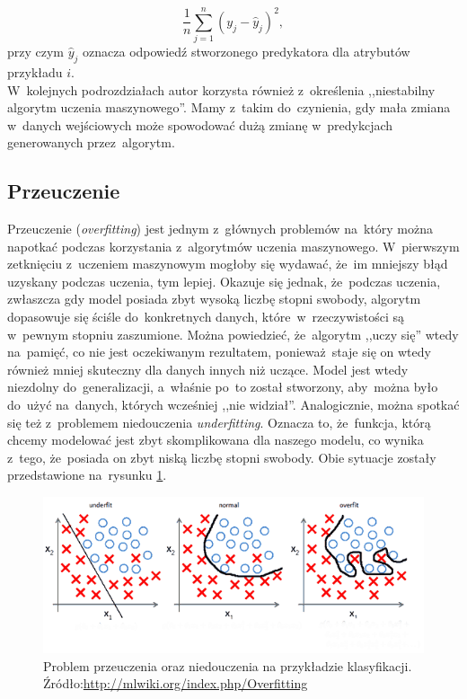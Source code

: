 \begin{equation}
\frac{1}{n} \sum_{j=1}^{n}(y_j - \hat{y}_j)^{2}, 
\end{equation}
przy czym $\hat{y}_j$ oznacza odpowiedź stworzonego predykatora dla atrybutów przykładu $i$.\\
W~kolejnych podrozdziałach autor korzysta również z~określenia ,,niestabilny algorytm uczenia maszynowego''. Mamy z~takim do~czynienia, gdy mała zmiana w~danych wejściowych może spowodować dużą zmianę w~predykcjach generowanych przez~algorytm\cite{ensemble}.

\subsection{Przeuczenie}\label{overfitting_section}
Przeuczenie (\textit{overfitting}) jest jednym z~głównych problemów na~który można napotkać podczas korzystania z~algorytmów uczenia maszynowego. W~pierwszym zetknięciu z~uczeniem maszynowym mogłoby się wydawać, że~im mniejszy błąd uzyskany podczas uczenia, tym lepiej. Okazuje się jednak, że~podczas uczenia, zwłaszcza gdy model posiada zbyt wysoką liczbę stopni swobody, algorytm dopasowuje się ściśle do~konkretnych danych, które~w~rzeczywistości są w~pewnym stopniu zaszumione. Można powiedzieć, że~algorytm ,,uczy się'' wtedy na~pamięć, co nie jest oczekiwanym rezultatem, ponieważ~staje się on wtedy również mniej skuteczny dla danych innych niż uczące.  Model jest wtedy niezdolny do~generalizacji, a~właśnie po~to został stworzony, aby~można było do~użyć na~danych, których wcześniej ,,nie widział''. Analogicznie, można spotkać się też z~problemem niedouczenia \textit{underfitting}. Oznacza to, że~funkcja, którą chcemy modelować jest zbyt skomplikowana dla naszego modelu, co wynika z~tego, że~posiada on zbyt niską liczbę stopni swobody. Obie sytuacje zostały przedstawione na~rysunku \ref{overfitting}.

\begin{figure}[ht!]
\centering
\includegraphics[scale=0.8]{res/overfitting.png}
\caption[Caption for LOF]{Problem przeuczenia oraz niedouczenia na przykładzie klasyfikacji. Źródło:\url{http://mlwiki.org/index.php/Overfitting}\label{overfitting}} 
\end{figure}

